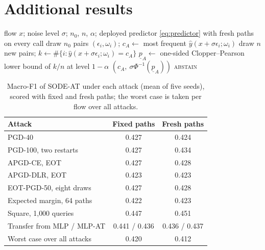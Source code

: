 \documentclass{article}
\theoremstyle{definition}
\begin{document}
\section{Additional results}\label{app:tables}
\begin{algorithm}[h]
\caption{\textsc{CertifySmoothed}$(x)$ for the stochastic detector}
\label{alg:certify}
\begin{algorithmic}[1]
\REQUIRE flow $x$; noise level $\sigma$; $n_0$, $n$, $\alpha$; deployed predictor \eqref{eq:predictor} with fresh paths on every call
\STATE draw $n_0$ pairs $(\epsilon_i,\omega_i)$; $c_A\leftarrow$ most frequent $\hat y(x+\sigma\epsilon_i;\omega_i)$ \hfill{}
\STATE draw $n$ new pairs; $k\leftarrow\#\{i:\hat y(x+\sigma\epsilon_i;\omega_i)=c_A\}$ \hfill{}
\STATE $\underline p_A\leftarrow$ one-sided Clopper--Pearson lower bound of $k/n$ at level $1-\alpha$
 \RETURN $(c_A,\ \sigma\Phi^{-1}(\underline p_A))$ \ELSE \RETURN \textsc{abstain} \ENDIF
\end{algorithmic}
\end{algorithm}

\begin{table}[h]
\caption{Macro-F1 of SODE-AT under each attack (mean of five seeds), scored with
fixed and fresh paths; the worst case is taken per flow over all attacks.}
\label{tab:attacks}
\centering\small
\begin{tabular}{lcc}
\toprule
Attack & Fixed paths & Fresh paths\\
\midrule
PGD-40 & 0.427 & 0.424\\
PGD-100, two restarts & 0.427 & 0.434\\
APGD-CE, EOT & 0.427 & 0.428\\
APGD-DLR, EOT & 0.423 & 0.423\\
EOT-PGD-50, eight draws & 0.427 & 0.428\\
Expected margin, 64 paths & 0.422 & 0.423\\
Square, 1{,}000 queries & 0.447 & 0.451\\
Transfer from MLP / MLP-AT & 0.441 / 0.436 & 0.436 / 0.437\\
\midrule
Worst case over all attacks & 0.420 & 0.412\\
\bottomrule
\end{tabular}
\end{table}
\end{document}
